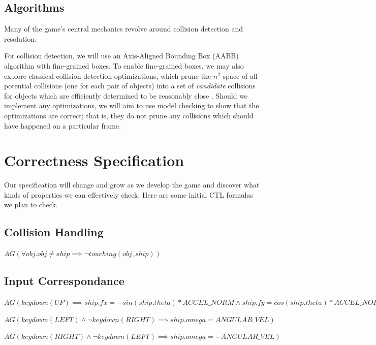 \documentclass{article}
\begin{document}
    \subsection{Algorithms}

        Many of the game's central mechanics revolve around collision detection
        and resolution.

        For collision detection, we will use an Axis-Aligned Bounding Box (AABB)
        algorithm with fine-grained boxes. To enable fine-grained boxes, we may
        also explore classical collision detection optimizations, which prune
        the $n^2$ space of all potential collisions (one for each pair of
        objects) into a set of \textit{candidate} collisions for objects which
        are efficiently determined to be reasonably close
        \cite{moore1988collision, palmer1995collision}. Should we implement any
        optimizations, we will aim to use model checking to show that the
        optimizations are correct; that is, they do not prune any collisions
        which should have happened on a particular frame.

\section{Correctness Specification}

    Our specification will change and grow as we develop the game and discover
    what kinds of properties we can effectively check. Here are some initial CTL
    formulas we plan to check.

    \subsection{Collision Handling}

        $AG(\forall obj. obj \neq ship \implies \lnot touching(obj,ship))$

    \subsection{Input Correspondance}

        $AG(keydown(UP) \implies ship.fx = -sin(ship.theta) * ACCEL\_NORM
                        \land ship.fy = cos(ship.theta) * ACCEL\_NORM)$

        $AG(keydown(LEFT) \land \lnot keydown(RIGHT) \implies ship.omega = ANGULAR\_VEL)$

        $AG(keydown(RIGHT) \land \lnot keydown(LEFT) \implies ship.omega = -ANGULAR\_VEL)$
\end{document}
